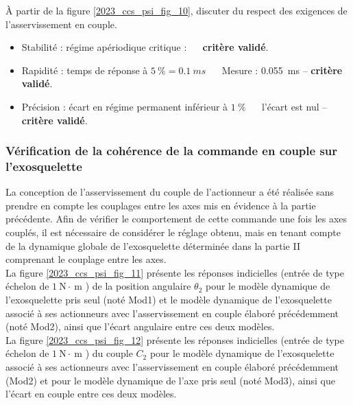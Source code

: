 \begin{question}
\label{2023_ccs_psi_q_20}
À partir de la figure \ref{2023_ccs_psi_fig_10}, discuter du respect des exigences de l'asservissement en couple.
\end{question}
\ifprof
\begin{corrige}
\begin{itemize}
\item Stabilité : régime apériodique critique : $\quad$ \textbf{critère validé}.
\item Rapidité : temps de réponse à $\SI{5}{\%} =\SI{0,1}{ms}$ $\quad$ Mesure : \SI{0,055}{ms} --  \textbf{critère validé}.
\item Précision : écart en régime permanent inférieur à $\SI{1}{\%}$ $\quad$ l'écart est nul -- \textbf{critère validé}.
\end{itemize}

\end{corrige}
\else
\fi



\subsubsection{Vérification de la cohérence de la commande en couple sur l'exosquelette}
La conception de l'asservissement du couple de l'actionneur a été réalisée sans prendre en compte les couplages entre les axes mis en évidence à la partie précédente. Afin de vérifier le comportement de cette commande une fois les axes couplés, il est nécessaire de considérer le réglage obtenu, mais en tenant compte de la dynamique globale de l'exosquelette déterminée dans la partie II comprenant le couplage entre les axes.\\
La figure \ref{2023_ccs_psi_fig_11} présente les réponses indicielles (entrée de type échelon de $1 \mathrm{~N} \cdot \mathrm{~m}$ ) de la position angulaire $\theta_{2}$ pour le modèle dynamique de l'exosquelette pris seul (noté Mod1) et le modèle dynamique de l'exosquelette associé à ses actionneurs avec l'asservissement en couple élaboré précédemment (noté Mod2), ainsi que l'écart angulaire entre ces deux modèles.\\
La figure \ref{2023_ccs_psi_fig_12} présente les réponses indicielles (entrée de type échelon de $1 \mathrm{~N} \cdot \mathrm{~m}$ ) du couple $C_{2}$ pour le modèle dynamique de l'exosquelette associé à ses actionneurs avec l'asservissement en couple élaboré précédemment (Mod2) et pour le modèle dynamique de l'axe pris seul (noté Mod3), ainsi que l'écart en couple entre ces deux modèles.\\


